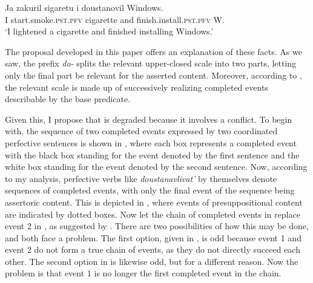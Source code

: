 \documentclass[output=paper,
colorlinks,
citecolor=brown,
newtxmath
]{langscibook}
\begin{document}

\z


\ea\label{12345}
\gll Ja zakuril sigaretu i doustanovil Windows.\\
I {start.smoke.}\textsc{pst.pfv} cigarette and {finish.install.}\textsc{pst.pfv} W.\\
\glt `I lightened a cigarette and finished installing Windows.'
\z

\noindent The proposal developed in this paper offers an explanation of these facts. As we saw, the prefix \textit{do-} splits the relevant upper-closed scale into two parts, letting only the final part be relevant for the asserted content. Moreover, according to , the relevant scale is made up of successively realizing completed events describable by the base predicate.

Given this, I propose that  is degraded because it involves a conflict. To begin with, the sequence of two completed events expressed by two coordinated perfective sentences is shown in , where each box represents a completed event with the black box standing for the event denoted by the first sentence and the white box standing for the event denoted by the second sentence.  Now, according to my analysis, perfective verbs like \textit{doustanavlivat'} by themselves denote sequences of completed events, with only the final event of the sequence being assertoric content. This is depicted in , where events of presuppositional content are indicated by dotted boxes. Now let the chain of completed events in  replace event 2 in , as suggested by . There are two possibilities of how this may be done, and both face a problem. The first option, given in , is odd because event 1 and event 2 do not form a true chain of events, as they do not directly succeed each other. The second option in  is likewise odd, but for a different reason. Now the problem is that event 1 is no longer the first completed event in the chain.

\end{document}
